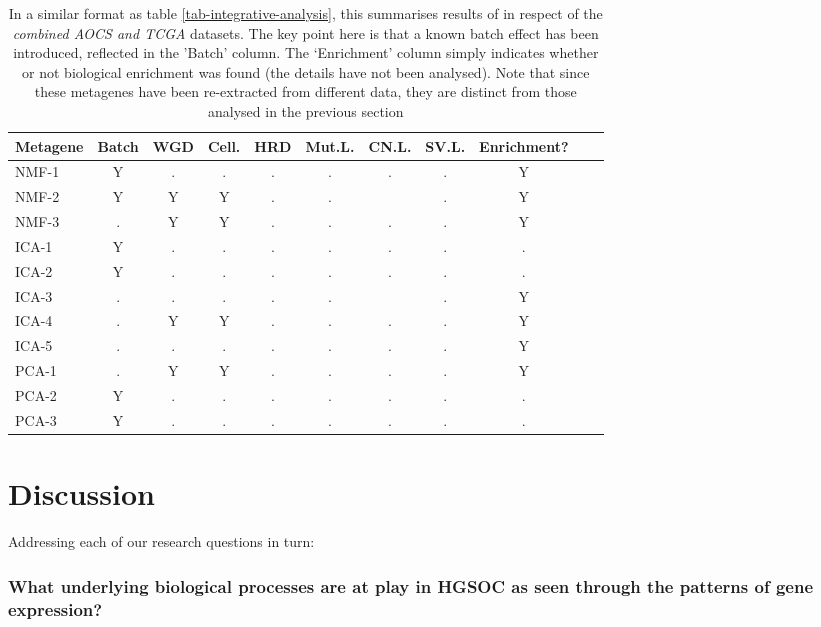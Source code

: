 \documentclass[tikz, 12pt,a4paper,oneside,fleqn]{article}
\begin{document}
\begin{table}[htb!]
\begin{center}
\begingroup
\renewcommand{\arraystretch}{1.4} %
\begin{tabular}{|l||c|c|c|c|c|c|c|c|l|l|}
\hline
Metagene & Batch & WGD & Cell. & HRD & Mut.L. & CN.L. & SV.L. & Enrichment? \\
\hline
NMF-1 & Y & . & . & . & . & . & . &  Y \\
NMF-2 & Y & Y & Y & . & . &   & . &  Y \\
NMF-3 & . & Y & Y & . & . & . & . &  Y \\
\hline
ICA-1 & Y & . & . & . & . & . & . &  . \\
ICA-2 & Y & . & . & . & . & . & . &  . \\
ICA-3 & . & . & . & . & . &   & . &  Y \\
ICA-4 & . & Y & Y & . & . & . & . &  Y \\
ICA-5 & . & . & . & . & . & . & . &  Y \\
\hline
PCA-1 & . & Y & Y & . & . & . & . &  Y \\
PCA-2 & Y & . & . & . & . & . & . &  . \\
PCA-3 & Y & . & . & . & . & . & . &  . \\
\hline
\end{tabular}
\endgroup
\end{center}
\caption{In a similar format as table \ref{tab-integrative-analysis}, this summarises results of in respect of the \emph{combined AOCS and TCGA} datasets.  The key point here is that a known batch effect has been introduced, reflected in the 'Batch' column.  The `Enrichment' column simply indicates whether or not biological enrichment was found (the details have not been analysed).   Note that since these metagenes have been re-extracted from different data, they are distinct from those analysed in the previous section}
\label{tab-integrative-analysis-BOTH}
\end{table}

\FloatBarrier

\section{Discussion}

Addressing each of our research questions in turn:

\subsubsection*{What underlying biological processes are at play in HGSOC as seen through the patterns of gene expression? }
\end{document}
